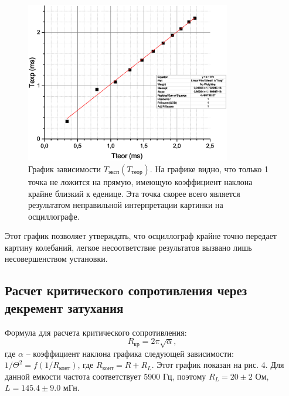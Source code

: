 \documentclass[a4paper, 14pt]{extarticle}%
\newcommand\ECaption[1]{%
     \captionsetup{font=footnotesize}%
     \caption{#1}}
\begin{document}
\begin{figure}[h!]
\begin{center}
\includegraphics[width=0.8\textwidth]{TT}
\end{center}
\ECaption{График зависимости $T_{\text{эксп}}(T_{\text{теор}})$. На графике видно, что только 1 точка не ложится на прямую, имеющую коэффициент наклона крайне близкий к еденице. Эта точка скорее всего является результатом неправильной интерпретации картинки на осциллографе. }
\end{figure}

Этот график позволяет утверждать, что осциллограф крайне точно передает картину колебаний, легкое несоответствие результатов вызвано лишь несовершенством установки. 

\subsection*{Расчет критического сопротивления через декремент затухания}

Формула для расчета критического сопротивления:
\begin{equation}
R_{\text{кр}} = 2\pi\sqrt{\alpha},
\end{equation}
где $\alpha$ -- коэффициент наклона графика следующей зависимости:\\ $1/\Theta^2 = f(1/R_{\text{конт}})$, где $R_{\text{конт}} = R+R_L$.  Этот график показан на рис. 4. Для данной емкости частота соответствует 5900 Гц, поэтому $R_L = 20\pm2$ Ом, $L = 145.4\pm9.0$ мГн. 
\end{document}

